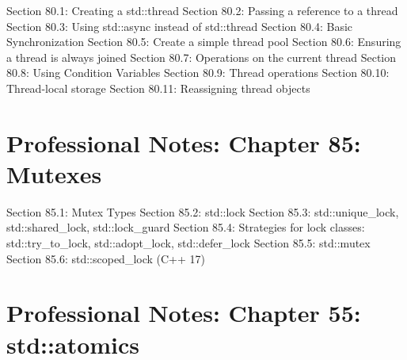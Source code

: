 Section 80.1: Creating a std::thread Section 80.2: Passing a reference
to a thread Section 80.3: Using std::async instead of std::thread
Section 80.4: Basic Synchronization Section 80.5: Create a simple thread
pool Section 80.6: Ensuring a thread is always joined Section 80.7:
Operations on the current thread Section 80.8: Using Condition Variables
Section 80.9: Thread operations Section 80.10: Thread-local storage
Section 80.11: Reassigning thread objects

\hypertarget{professional-notes-chapter-85-mutexes}{%
\chapter{Professional Notes: Chapter 85:
Mutexes}\label{professional-notes-chapter-85-mutexes}}

Section 85.1: Mutex Types Section 85.2: std::lock Section 85.3:
std::unique\_lock, std::shared\_lock, std::lock\_guard Section 85.4:
Strategies for lock classes: std::try\_to\_lock, std::adopt\_lock,
std::defer\_lock Section 85.5: std::mutex Section 85.6:
std::scoped\_lock (C++ 17)

\hypertarget{professional-notes-chapter-55-stdatomics}{%
\chapter{Professional Notes: Chapter 55:
std::atomics}\label{professional-notes-chapter-55-stdatomics}}

